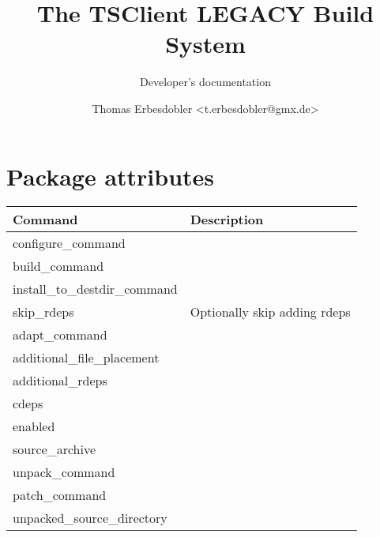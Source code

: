 \documentclass[a4paper]{scrartcl}
\title{The TSClient LEGACY Build System}
\subtitle{Developer's documentation}
\author{Thomas Erbesdobler <t.erbesdobler@gmx.de>}
\begin{document}
	\maketitle
	\tableofcontents
	
	\section{Package attributes}
	\label{sec:package_attributes}
	
	\begin{tabularx}{\textwidth}{lX}
		Command & Description \\
		\hline
		configure\_command & \\
		build\_command & \\
		install\_to\_destdir\_command & \\
		skip\_rdeps & Optionally skip adding rdeps \\
		adapt\_command & \\
		additional\_file\_placement & \\
		additional\_rdeps & \\
		cdeps & \\
		enabled & \\
		source\_archive & \\
		unpack\_command & \\
		patch\_command & \\
		unpacked\_source\_directory & \\
	\end{tabularx}
	
\end{document}
